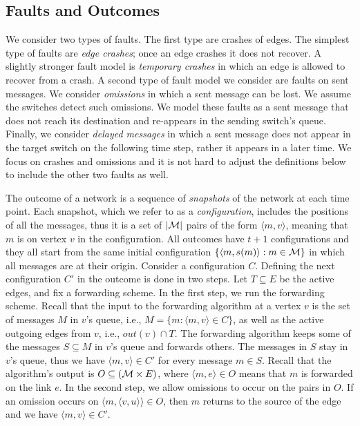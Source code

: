 \documentclass[11pt,eepic]{article}
\newcommand{\zug}[1]{\langle #1  \rangle}
\newcommand{\set}[1]{\{ #1  \}}
\newcommand{\M}{{\cal M}}
\begin{document}
	\subsection*{Faults and Outcomes}
		We consider two types of faults. The first type are crashes of edges. The simplest type of faults are {\em edge crashes}; once an edge crashes it does not recover. A slightly stronger fault model is {\em temporary crashes} in which an edge is allowed to recover from a crash. A second type of fault model we consider are faults on sent messages. We consider {\em omissions} in which a sent message can be lost. We assume the switches detect such omissions. We model these faults as a sent message that does not reach its destination and re-appears in the sending switch's queue.
		Finally, we consider {\em delayed messages} in which a sent message does not appear in the target switch on the following time step, rather it appears in a later time. We focus on crashes and omissions and it is not hard to adjust the definitions below to include the other two faults as well.

		The outcome of a network is a sequence of {\em snapshots} of the network at each time point. Each snapshot, which we refer to as a {\em configuration}, includes the positions of all the messages, thus it is a set of $|\M|$ pairs of the form $\zug{m,v}$, meaning that $m$ is on vertex $v$ in the configuration. All outcomes have $t+1$ configurations and they all start from the same initial configuration $\set{\zug{m, s(m)}: m \in \M}$ in which all messages are at their origin. Consider a configuration $C$. Defining the next configuration $C'$ in the outcome is done in two steps. Let $T \subseteq E$ be the active edges, and fix a  forwarding scheme. In the first step, we run the forwarding scheme. Recall that the input to the forwarding algorithm at a vertex $v$ is the set of messages $M$ in $v$'s queue, i.e., $M = \set{m: \zug{m,v} \in C}$, as well as the active outgoing edges from $v$, i.e., $out(v) \cap T$. The forwarding algorithm keeps some of the messages $S \subseteq M$ in $v$'s queue and forwards others. The messages in $S$ stay in $v$'s queue, thus we have $\zug{m,v} \in C'$ for every message $m\in S$. Recall that the algorithm's output is $O \subseteq (\M \times E)$, where $\zug{m, e} \in O$ means that $m$ is forwarded on the link $e$. In the second step, we allow omissions to occur on the pairs in $O$. If an omission occurs on $\zug{m, \zug{v,u}} \in O$, then $m$ returns to the source of the edge and we have $\zug{m,v} \in C'$.
\end{document}
